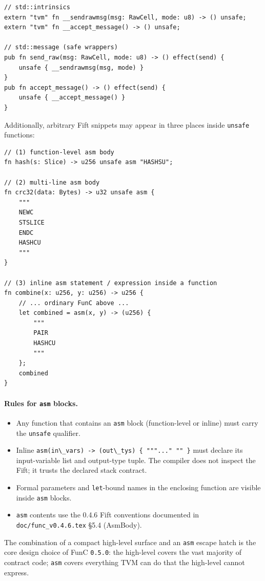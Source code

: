 \documentclass[12pt,oneside]{article}
\begin{document}
\begin{verbatim}
// std::intrinsics
extern "tvm" fn __sendrawmsg(msg: RawCell, mode: u8) -> () unsafe;
extern "tvm" fn __accept_message() -> () unsafe;

// std::message (safe wrappers)
pub fn send_raw(msg: RawCell, mode: u8) -> () effect(send) {
    unsafe { __sendrawmsg(msg, mode) }
}
pub fn accept_message() -> () effect(send) {
    unsafe { __accept_message() }
}
\end{verbatim}

Additionally, arbitrary Fift snippets may appear in three places inside
\verb|unsafe| functions:

\begin{verbatim}
// (1) function-level asm body
fn hash(s: Slice) -> u256 unsafe asm "HASHSU";

// (2) multi-line asm body
fn crc32(data: Bytes) -> u32 unsafe asm {
    """
    NEWC
    STSLICE
    ENDC
    HASHCU
    """
}

// (3) inline asm statement / expression inside a function
fn combine(x: u256, y: u256) -> u256 {
    // ... ordinary FunC above ...
    let combined = asm(x, y) -> (u256) {
        """
        PAIR
        HASHCU
        """
    };
    combined
}
\end{verbatim}

\paragraph{Rules for \texttt{asm} blocks.}

\begin{itemize}
\item Any function that contains an \verb|asm| block (function-level or
inline) must carry the \verb|unsafe| qualifier.
\item Inline \verb|asm(in\_vars) -> (out\_tys) { """..." "" }| must
declare its input-variable list and output-type tuple. The compiler
does not inspect the Fift; it trusts the declared stack contract.
\item Formal parameters and \verb|let|-bound names in the enclosing
function are visible inside \verb|asm| blocks.
\item \verb|asm| contents use the 0.4.6 Fift conventions documented in
\verb|doc/func_v0.4.6.tex| \S5.4 (AsmBody).
\end{itemize}

The combination of a compact high-level surface and an \verb|asm|
escape hatch is the core design choice of FunC \verb|0.5.0|: the
high-level covers the vast majority of contract code; \verb|asm|
covers everything TVM can do that the high-level cannot express.
\end{document}
